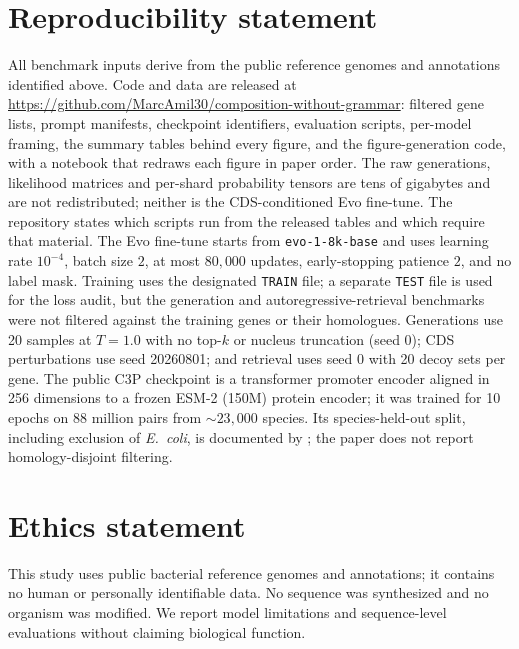 \documentclass{article}
\newcommand{\rev}[1]{\begingroup\color{red}#1\endgroup}
\begin{document}
\clearpage
\section*{Reproducibility statement}
All benchmark inputs derive from the public reference genomes and annotations
identified above. \rev{Code and data are released at
\url{https://github.com/MarcAmil30/composition-without-grammar}: filtered gene
lists, prompt manifests, checkpoint identifiers, evaluation scripts, per-model
framing, the summary tables behind every figure, and the figure-generation code,
with a notebook that redraws each figure in paper order. The raw generations,
likelihood matrices and per-shard probability tensors are tens of gigabytes and
are not redistributed; neither is the CDS-conditioned Evo fine-tune. The
repository states which scripts run from the released tables and which require
that material.}
The Evo fine-tune starts from \texttt{evo-1-8k-base} and uses learning rate
$10^{-4}$, batch size $2$, at most $80{,}000$ updates, early-stopping patience
$2$, and no label mask. Training uses the designated \texttt{TRAIN} file; a
separate \texttt{TEST} file is used for the loss audit, but the generation and
autoregressive-retrieval benchmarks were not filtered against the training
genes or their homologues. Generations use 20 samples at $T=1.0$ with no top-$k$
or nucleus truncation (seed 0); CDS perturbations use seed 20260801; and
retrieval uses seed 0 with 20 decoy sets per gene. The public C3P checkpoint is
a transformer promoter encoder aligned in 256 dimensions to a frozen ESM-2
(150M) protein encoder; it was trained for 10 epochs on 88 million pairs from
${\sim}23{,}000$ species. Its species-held-out split, including exclusion of
\emph{E.~coli}, is documented by \citet{dufault2026c3p}; the paper does not report
homology-disjoint filtering.

\section*{Ethics statement}
This study uses public bacterial reference genomes and annotations; it contains
no human or personally identifiable data. No sequence was synthesized and no
organism was modified. We report model limitations and sequence-level evaluations without
claiming biological function.



\end{document}
